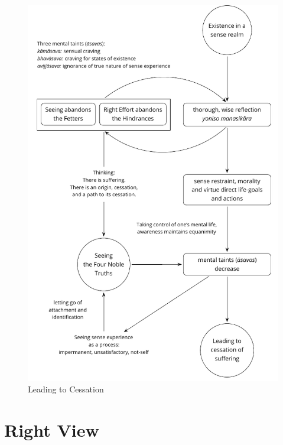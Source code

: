 \clearpage

\begin{figure}[h]
\vspace*{-10mm}%
\caption{Leading to Cessation}\label{fig-leading-to-cessation}

\centering

\includegraphics[width=\linewidth-5mm]{./manuscript/tex/diagrams/leading-to-cessation.pdf}

\end{figure}

\clearpage
\normalpagelayout

\section{Right View}

